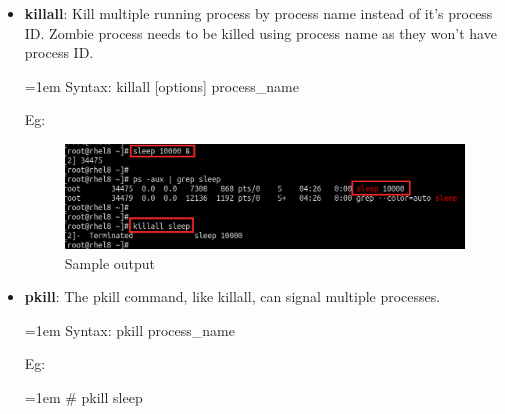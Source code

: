 \begin{flushleft}
\begin{itemize}
\begin{itemize}
\begin{itemize}
		
			\end{itemize}
		

					
		\end{itemize}
	
	\newpage
	\item \textbf{killall}: Kill multiple running process by process name instead of it's process ID. Zombie process needs to be killed using process name as they won't have process ID.
	\bigskip
	\begin{tcolorbox}[breakable,notitle,boxrule=-0pt,colback=pink,colframe=pink]
		\color{black}
		\font=1em
		Syntax: killall [options] process\_name
		\font=4pt
	\end{tcolorbox}
	Eg:
	\begin{figure}[h!]
		\centering
		\includegraphics[scale=0.25]{content/chapter12/images/kill4.png}
		\caption{Sample output}
		\label{fig:top_command_output5}
	\end{figure}

	\item \textbf{pkill}: The pkill command, like killall, can signal multiple processes.
	\bigskip
	\begin{tcolorbox}[breakable,notitle,boxrule=-0pt,colback=pink,colframe=pink]
		\color{black}
		\font=1em
		Syntax: pkill process\_name
		\font=4pt
	\end{tcolorbox}
	Eg:
	\begin{tcolorbox}[breakable,notitle,boxrule=-0pt,colback=black,colframe=black]
		\color{green}
		\font=1em
		\# pkill sleep
		\font=4pt
	\end{tcolorbox}

		
	\end{itemize}

\end{flushleft}

\newpage


